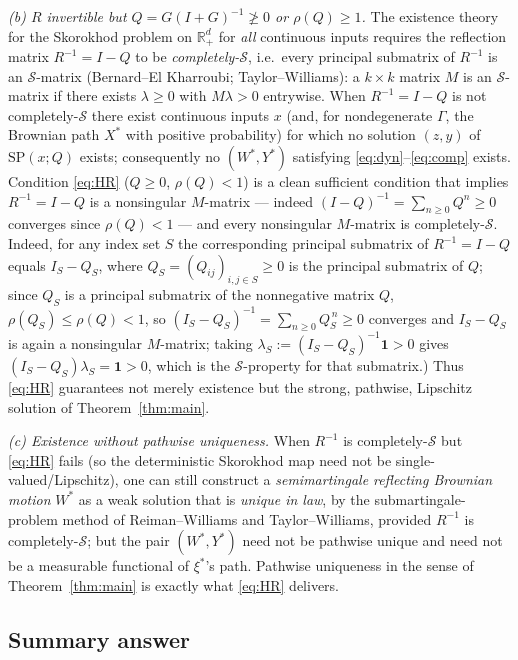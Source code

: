 \documentclass{amsart}
\theoremstyle{definition}
\theoremstyle{remark}
\newcommand{\R}{\mathbb{R}}
\begin{document}
\emph{(b) $R$ invertible but $Q=G(I+G)^{-1}\not\ge0$ or $\rho(Q)\ge1$.} The
existence theory for the Skorokhod problem on $\R_+^d$ for \emph{all} continuous
inputs requires the reflection matrix $R^{-1}=I-Q$ to be \emph{completely-}$\mathcal S$,
i.e.\ every principal submatrix of $R^{-1}$ is an $\mathcal S$-matrix (Bernard--El
Kharroubi; Taylor--Williams): a $k\times k$ matrix $M$ is an $\mathcal S$-matrix
if there exists $\lambda\ge0$ with $M\lambda>0$ entrywise. When $R^{-1}=I-Q$ is
not completely-$\mathcal S$ there exist continuous inputs $x$ (and, for
nondegenerate $\Gamma$, the Brownian path $X^\ast$ with positive probability)
for which no solution $(z,y)$ of $\mathrm{SP}(x;Q)$ exists; consequently no
$(W^\ast,Y^\ast)$ satisfying \eqref{eq:dyn}--\eqref{eq:comp} exists.
Condition \eqref{eq:HR} ($Q\ge0$, $\rho(Q)<1$) is a clean sufficient condition
that implies $R^{-1}=I-Q$ is a nonsingular $M$-matrix --- indeed
$(I-Q)^{-1}=\sum_{n\ge0}Q^n\ge0$ converges since $\rho(Q)<1$ --- and every
nonsingular $M$-matrix is completely-$\mathcal S$. Indeed, for any index set $S$ the corresponding
principal submatrix of $R^{-1}=I-Q$ equals $I_S-Q_S$, where $Q_S=(Q_{ij})_{i,j\in S}\ge0$
is the principal submatrix of $Q$; since $Q_S$ is a principal submatrix of the
nonnegative matrix $Q$, $\rho(Q_S)\le\rho(Q)<1$, so
$(I_S-Q_S)^{-1}=\sum_{n\ge0}Q_S^{\,n}\ge0$ converges and $I_S-Q_S$ is again a
nonsingular $M$-matrix; taking $\lambda_S:=(I_S-Q_S)^{-1}\mathbf 1>0$ gives
$(I_S-Q_S)\lambda_S=\mathbf 1>0$, which is the $\mathcal S$-property for that
submatrix.) Thus \eqref{eq:HR} guarantees not merely existence but the strong,
pathwise, Lipschitz solution of Theorem~\ref{thm:main}.

\emph{(c) Existence without pathwise uniqueness.} When $R^{-1}$ is
completely-$\mathcal S$ but \eqref{eq:HR} fails (so the deterministic Skorokhod
map need not be single-valued/Lipschitz), one can still construct a
\emph{semimartingale reflecting Brownian motion} $W^\ast$ as a weak solution
that is \emph{unique in law}, by the submartingale-problem method of
Reiman--Williams and Taylor--Williams, provided $R^{-1}$ is completely-$\mathcal S$;
but the pair $(W^\ast,Y^\ast)$ need not be pathwise unique and need not be a
measurable functional of $\xi^\ast$'s path. Pathwise uniqueness in the sense of
Theorem~\ref{thm:main} is exactly what \eqref{eq:HR} delivers.

\subsection{Summary answer}
\end{document}
